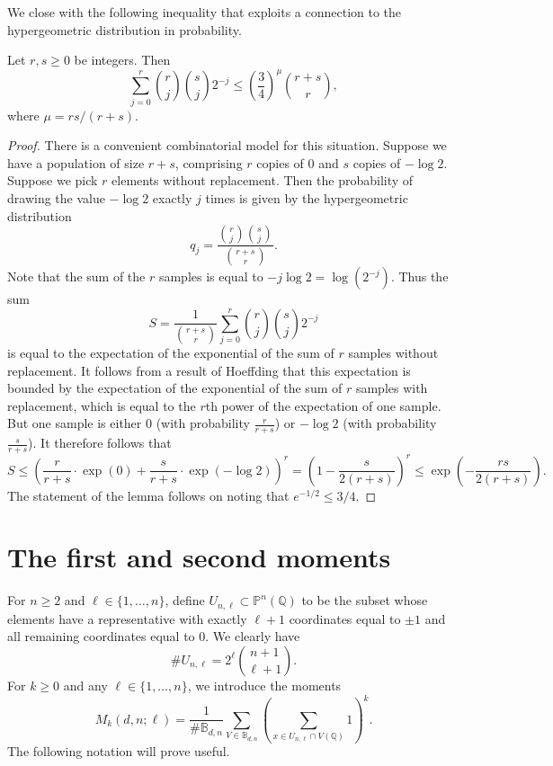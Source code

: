 \documentclass[11pt, reqno]{amsart}
\numberwithin{equation}{section}
\renewcommand{\leq}{\leqslant}
\renewcommand{\geq}{\geqslant}
\begin{document}
We close with the following inequality that exploits a connection to the hypergeometric distribution in probability. 

\begin{lemma}\label{lem:prob}
Let $r,s\geq 0$ be integers. Then 
$$
\sum_{j=0}^r\binom{r}{j}\binom{s}{j} 2^{-j}\leq \left(\frac{3}{4}\right)^\mu \binom{r+s}{r},
$$
where $\mu=rs/(r+s).$
\end{lemma}


\begin{proof}
There is a convenient combinatorial model for this situation. 
Suppose we have a population of size $r+s$, comprising $r$ copies of $0$ and $s$ copies of $-\log 2$. Suppose we pick $r$ elements without replacement. Then the  probability of drawing the value $-\log 2$ exactly $j$ times is given by the hypergeometric distribution 
$$
q_j=
\frac{\binom{r}{j}\binom{s}{j}}{\binom{r+s}{r}}.
$$
Note that the sum of the $r$ samples is equal to $-j\log2=\log(2^{-j})$. Thus the sum
$$
S=\frac{1}{\binom{r+s}{r}}\sum_{j=0}^r\binom{r}{j}\binom{s}{j} 2^{-j}
$$
is equal to the expectation of the exponential of the sum of $r$ samples without replacement. 
It follows from a result of 
Hoeffding \cite[Thm.~4]{hoeffding} that this expectation is bounded 
by the expectation of the exponential of the sum of $r$ samples with replacement, which is equal to the $r$th power of the expectation of one sample. But one sample is either $0$ (with probability $\frac{r}{r+s}$) or
$-\log 2$ (with probability $\frac{s}{r+s}$). It therefore follows that 
$$
S\leq \left(\frac{r}{r+s}\cdot \exp(0) +\frac{s}{r+s}\cdot \exp(-\log 2)\right)^r=\left(1-\frac{s}{2(r+s)}\right)^r\leq
\exp\left(-\frac{rs}{2(r+s)}\right).
$$
The statement of the lemma follows on noting that 
$e^{-1/2}\leq 3/4$.
\end{proof}




\section{The first and second moments}\label{sec:moments}

For $n \geq 2$ and $\ell \in \{1, \dots, n\}$, define  $U_{n,\ell}\subset \mathbb{P}^n(\mathbb{Q})$ 
to be the 
 subset
whose elements have a representative with exactly $\ell+1$ coordinates equal to $\pm 1$ and all remaining coordinates equal to $0$. We clearly have
\begin{equation}
\label{Cardinality Unl}
\# U_{n,\ell} = 2^{\ell} \binom{n+1}{\ell+1}.
\end{equation}
For $k \geq 0$ and any $\ell \in \{1, \dots, n\}$, 
we introduce the moments
\begin{equation}\label{eq:moment}
M_k(d,n;\ell) = \frac1{\# \mathbb{B}_{d,n}} \sum_{V \in \mathbb{B}_{d,n}} \left( \sum_{x \in U_{n,\ell} \cap V(\mathbb{Q})} 1 \right)^k.
\end{equation}
The following  notation will prove useful.
\end{document}
